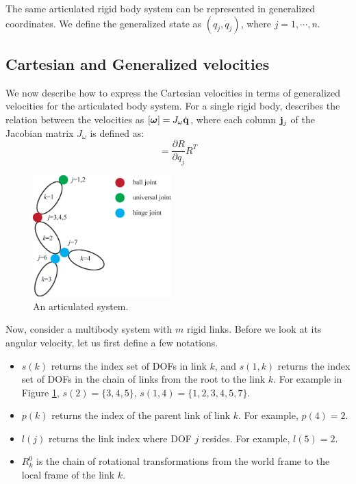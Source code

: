 The same articulated rigid body system can be represented in
generalized coordinates. We define the generalized state as $(q_j,
\dot{q}_j)$, where $j = 1, \cdots, n$.

\subsection{Cartesian and Generalized velocities}
We now describe how to express the Cartesian velocities in terms of generalized velocities for the articulated body system. 
For a single rigid body,  describes the relation between the velocities as $[\bm{\omega}] = J_{\omega} \dot{\mathbf{q}}$,
where each column $\mathbf{j}_j$ of the Jacobian matrix $J_{\omega}$ is defined as:
\begin{equation}
[\vc{j}_j] = \frac{\partial R}{\partial q_j} R^T
\end{equation}

\begin{figure}
 \vspace{-10pt}
\begin{center}
\includegraphics[width=2.1in]{example1.eps}
\end{center}
\caption{An articulated system.}
 \vspace{-20pt}
\label{fig:example1}
\end{figure}

Now, consider a multibody system with $m$ rigid links. Before we look
at its angular velocity, let us first define a few notations.
\begin{itemize}
\item $s(k)$ returns the index set of DOFs in link $k$, and $s(1, k)$
  returns the index set of DOFs in the chain of links from the root to
  the link $k$. For example in Figure \ref{fig:example1}, $s(2) = \{3, 4, 5\}$, $s(1, 4) = \{1, 2, 3,
    4, 5, 7\}$.
\item $p(k)$ returns the index of the parent link of link $k$. For
  example, $p(4) = 2$.
\item $l(j)$ returns the link index where DOF $j$ resides. For
  example, $l(5) = 2$.
\item $R^0_k$ is the chain of rotational transformations from the
  world frame to the local frame of the link $k$.
\end{itemize}

